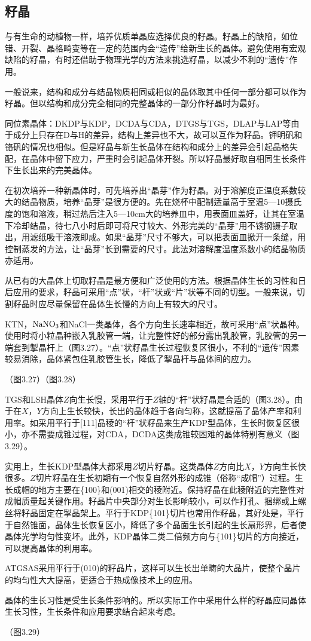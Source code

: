 ﻿\subsection{籽晶}
与有生命的动植物一样，培养优质单晶应选择优良的籽晶。籽晶上的缺陷，如位错、开裂、晶格畸变等在一定的范围内会“遗传”给新生长的晶体。避免使用有宏观缺陷的籽晶，有时还借助于物理光学的方法来挑选籽晶，以减少不利的“遗传”作用。

一般说来，结构和成分与结晶物质相同或相似的晶体取其中任何一部分都可以作为籽晶。但以结构和成分完全相同的完整晶体的一部分作籽晶时为最好。

同位素晶体：DKDP与KDP，DCDA与CDA，DTGS与TGS，DLAP与LAP等由于成分上只存在D与H的差异，结构上差异也不大，故可以互作为籽晶。钾明矾和铬矾的情况也相似。但是籽晶与新生长晶体在结构和成分上的差异会引起晶格失配，在晶体中留下应力，严重时会引起晶体开裂。所以籽晶最好取自相同生长条件下生长出来的完美晶体。

在初次培养一种新晶体时，可先培养出“晶芽”作为籽晶。对于溶解度正温度系数较大的结晶物质，培养“晶芽”是很方便的。先在烧杯中配制适量高于室温5---10摄氏度的饱和溶液，稍过热后注入5---10cm大的培养皿中，用表面皿盖好，让其在室温下冷却结晶，待七八小时后即可将尺寸较大、外形完美的“晶芽”用不锈钢镊子取出，用滤纸吸干溶液即成。如果“晶芽”尺寸不够大，可以把表面皿掀开一条缝，用控制蒸发的方法，让“晶芽”长到需要的尺寸。此法对溶解度温度系数小的结晶物质亦适用。

从已有的大晶体上切取籽晶是最方便和广泛使用的方法。根据晶体生长的习性和日后应用的要求，籽晶可采用“点”状，“杆”状或“片”状等不同的切型。一般来说，切割籽晶时应尽量保留在晶体生长慢的方向上有较大的尺寸。

KTN，$\rm NaNO_3$和NaCl一类晶体，各个方向生长速率相近，故可采用“点”状晶种。使用时将小粒晶种嵌入乳胶管一端，让完整性好的部分露出乳胶管，乳胶管的另一端套到掣晶杆上（图3.27）。“点”状籽晶生长过程恢复区很小，不利的“遗传”因素较易消除，晶体紧包住乳胶管生长，降低了掣晶杆与晶体间的应力。

（图3.27）（图3.28）

TGS和LSH晶体$Z$向生长慢，采用平行于$Z$轴的“杆”状籽晶是合适的（图3.28）。由于在$X$，$Y$方向上生长较快，长出的晶体趋于各向匀称，这就提高了晶体产率和利用率。如采用平行于[111]晶稜的“杆”状籽晶来生产KDP型晶体，生长时恢复区很小，亦不需要成锥过程，对CDA，DCDA这类成锥较困难的晶体特别有意义（图3.29）。

实用上，生长KDP型晶体大都采用$Z$切片籽晶。这类晶体$Z$方向比$X$，$Y$方向生长快很多。$Z$切片籽晶在生长初期有一个恢复自然外形的成锥（俗称“成帽”）过程。生长成帽的地方主要在\{100\}和(001)相交的稜附近。保持籽晶在此稜附近的完整性对成帽质量起关键作用。籽晶片中央部分对生长影响较小，可以作打孔、捆绑或上螺丝将籽晶固定在掣晶架上。平行于KDP\{101\}切片也常用作籽晶，其好处是，平行于自然锥面，晶体生长恢复区小，降低了多个晶面生长引起的生长扇形界，后者使晶体光学均匀性变坏。此外，KDP晶体二类二倍频方向与\{101\}切片的方向接近，可以提高晶体的利用率。

ATGSAS采用平行于(010)的籽晶片，这样可以生长出单畴的大晶片，使整个晶片的均匀性大大提高，更适合于热成像技术上的应用。

晶体的生长习性是受生长条件影响的。所以实际工作中采用什么样的籽晶应同晶体生长习性，生长条件和应用要求结合起来考虑。

（图3.29）
